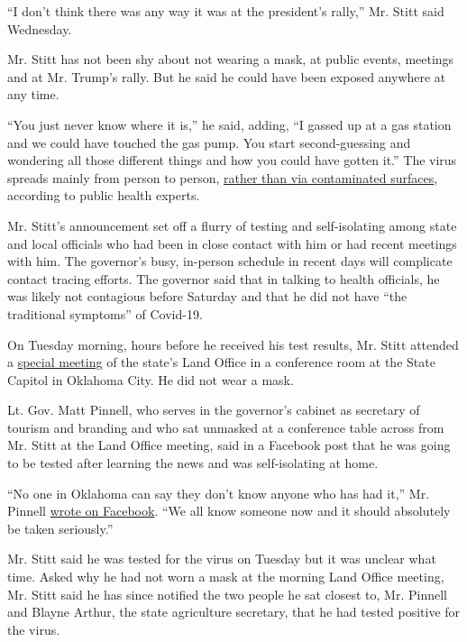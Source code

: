 ``I don't think there was any way it was at the president's rally,'' Mr.
Stitt said Wednesday.

Mr. Stitt has not been shy about not wearing a mask, at public events,
meetings and at Mr. Trump's rally. But he said he could have been
exposed anywhere at any time.

``You just never know where it is,'' he said, adding, ``I gassed up at a
gas station and we could have touched the gas pump. You start
second-guessing and wondering all those different things and how you
could have gotten it.'' The virus spreads mainly from person to person,
\href{https://www.nytimes3xbfgragh.onion/2020/05/22/health/cdc-coronavirus-touching-surfaces.html}{rather
than via contaminated surfaces}, according to public health experts.

Mr. Stitt's announcement set off a flurry of testing and self-isolating
among state and local officials who had been in close contact with him
or had recent meetings with him. The governor's busy, in-person schedule
in recent days will complicate contact tracing efforts. The governor
said that in talking to health officials, he was likely not contagious
before Saturday and that he did not have ``the traditional symptoms'' of
Covid-19.

On Tuesday morning, hours before he received his test results, Mr. Stitt
attended a
\href{https://tulsaworld.com/news/local/oklahoma-watch-gov-stitt-lashes-out-as-pick-to-run-land-office-is-approved-in/article_677a77e8-9b90-5344-8ad9-d3268fb1fb03.html}{special
meeting} of the state's Land Office in a conference room at the State
Capitol in Oklahoma City. He did not wear a mask.

Lt. Gov. Matt Pinnell, who serves in the governor's cabinet as secretary
of tourism and branding and who sat unmasked at a conference table
across from Mr. Stitt at the Land Office meeting, said in a Facebook
post that he was going to be tested after learning the news and was
self-isolating at home.

``No one in Oklahoma can say they don't know anyone who has had it,''
Mr. Pinnell
\href{https://www.facebookcorewwwi.onion/matt.pinnell.5/posts/10223594197268150}{wrote
on Facebook}. ``We all know someone now and it should absolutely be
taken seriously.''

Mr. Stitt said he was tested for the virus on Tuesday but it was unclear
what time. Asked why he had not worn a mask at the morning Land Office
meeting, Mr. Stitt said he has since notified the two people he sat
closest to, Mr. Pinnell and Blayne Arthur, the state agriculture
secretary, that he had tested positive for the virus.

